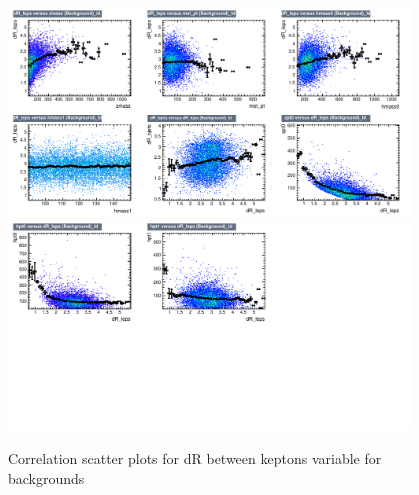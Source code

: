 \begin{figure}[!htb]%
\centering
\includegraphics[width=0.95\textwidth]{figures/CRTT/dataset/plots/correlationscatter_dR_leps__Id_c3.pdf}
\includegraphics[width=0.95\textwidth]{figures/CRTT/dataset/plots/correlationscatter_dR_leps__Id_c4.pdf}
\caption{ Correlation scatter plots for dR between keptons variable for backgrounds}%
\label{fig:correlations_CRTT_drleps_BG}                                                       
\end{figure}



